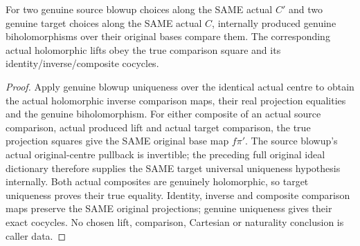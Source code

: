 \begin{theorem}
\label{hir:submersion-blowup-lift-choices}
\leanok
{}
For two genuine source blowup choices along the SAME actual $C'$ and two genuine target choices along the SAME actual $C$, internally produced genuine biholomorphisms over their original bases compare them. The corresponding actual holomorphic lifts obey the true comparison square and its identity/inverse/composite cocycles.
\end{theorem}
\begin{proof}
Apply genuine blowup uniqueness over the identical actual centre to obtain the actual holomorphic inverse comparison maps, their real projection equalities and the genuine biholomorphism. For either composite of an actual source comparison, actual produced lift and actual target comparison, the true projection squares give the SAME original base map $f\pi'$. The source blowup's actual original-centre pullback is invertible; the preceding full original ideal dictionary therefore supplies the SAME target universal uniqueness hypothesis internally. Both actual composites are genuinely holomorphic, so target uniqueness proves their true equality. Identity, inverse and composite comparison maps preserve the SAME original projections; genuine uniqueness gives their exact cocycles. No chosen lift, comparison, Cartesian or naturality conclusion is caller data.
\end{proof}

